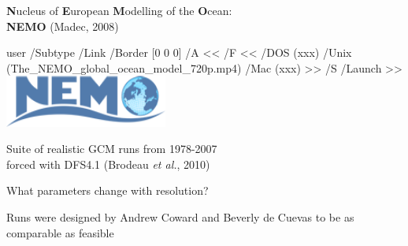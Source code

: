 \documentclass{beamer}
\newcommand{\LaunchBinary}[2]{%
  \leavevmode%
  \pdfstartlink user {
    /Subtype /Link
    /Border [0 0 0]%
    /A <<
      /F <<
         /DOS (xxx)
         /Unix (#1)
         /Mac (xxx)
      >>
      /S /Launch
    >>
  }#2%
  \pdfendlink%
}
\begin{document}
\begin{frame}{\textbf{N}ucleus of \textbf{E}uropean \textbf{M}odelling of the \textbf{O}cean:\\\textbf{NEMO} (Madec, 2008)}

\begin{center}
\LaunchBinary{The_NEMO_global_ocean_model_720p.mp4}{\includegraphics[width=0.4\textwidth]{Logo_NEMO.png}}%
\end{center}
\vspace{0.5cm}
\begin{alertblock}{}
    \centering Suite of realistic GCM runs from 1978-2007\\forced with DFS4.1 (Brodeau \textit{et al.}, 2010) 
\end{alertblock}
\end{frame}

\begin{frame}{What parameters change with resolution?}

\begin{table}
\end{table}
\begin{alertblock}{}
    \centering Runs were designed by Andrew Coward and Beverly de Cuevas to be as comparable as feasible 
\end{alertblock}
\end{frame}
\end{document}
